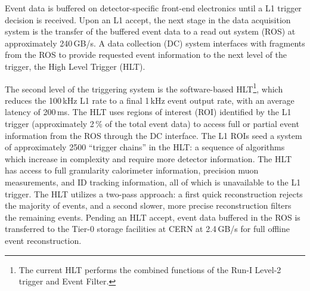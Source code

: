 Event data is buffered on detector-specific front-end electronics until a L1 trigger decision is received. Upon an L1 accept, the next stage in the data acquisition system is the transfer of the buffered event data to a read out system (ROS) at approximately 240\,GB/s. A data collection (DC) system interfaces with fragments from the ROS to provide requested event information to the next level of the trigger, the High Level Trigger (HLT). 

The second level of the triggering system is the software-based HLT\footnote{The current HLT performs the combined functions of the Run-I Level-2 trigger and Event Filter.}, which reduces the 100\,kHz L1 rate to a final 1\,kHz event output rate, with an average latency of 200\,ms. The HLT uses regions of interest (ROI) identified by the L1 trigger (approximately 2\,\% of the total event data) to access full or partial event information from the ROS through the DC interface. The L1 ROIs seed a system of approximately 2500 ``trigger chains'' in the HLT: a sequence of algorithms which increase in complexity and require more detector information. The HLT has access to full granularity calorimeter information, precision muon measurements, and ID tracking information, all of which is unavailable to the L1 trigger. The HLT utilizes a two-pass approach: a first quick reconstruction rejects the majority of events, and a second slower, more precise reconstruction filters the remaining events. Pending an HLT accept, event data buffered in the ROS is transferred to the Tier-0 storage facilities at CERN at 2.4\,GB/s for full offline event reconstruction. 

